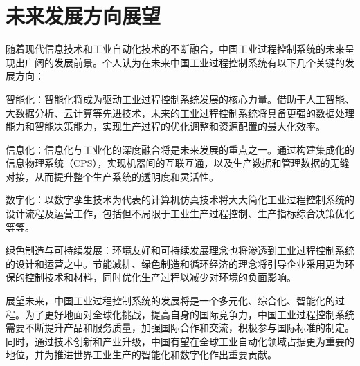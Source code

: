\documentclass{my_class}
\begin{document}
%
\section{未来发展方向展望}
随着现代信息技术和工业自动化技术的不断融合，中国工业过程控制系统的未来呈现出广阔的发展前景。个人认为在未来中国工业过程控制系统有以下几个关键的发展方向：

智能化：智能化将成为驱动工业过程控制系统发展的核心力量。借助于人工智能、大数据分析、云计算等先进技术，未来的工业过程控制系统将具备更强的数据处理能力和智能决策能力，实现生产过程的优化调整和资源配置的最大化效率。

信息化：信息化与工业化的深度融合将是未来发展的重点之一。通过构建集成化的信息物理系统（CPS），实现机器间的互联互通，以及生产数据和管理数据的无缝对接，从而提升整个生产系统的透明度和灵活性。

数字化：以数字孪生技术为代表的计算机仿真技术将大大简化工业过程控制系统的设计流程及运营工作，包括但不局限于工业生产过程控制、生产指标综合决策优化等等。

绿色制造与可持续发展：环境友好和可持续发展理念也将渗透到工业过程控制系统的设计和运营之中。节能减排、绿色制造和循环经济的理念将引导企业采用更为环保的控制技术和材料，同时优化生产过程以减少对环境的负面影响。

展望未来，中国工业过程控制系统的发展将是一个多元化、综合化、智能化的过程。为了更好地面对全球化挑战，提高自身的国际竞争力，中国工业过程控制系统需要不断提升产品和服务质量，加强国际合作和交流，积极参与国际标准的制定。同时，通过技术创新和产业升级，中国有望在全球工业自动化领域占据更为重要的地位，并为推进世界工业生产的智能化和数字化作出重要贡献。


% 










\end{document}
